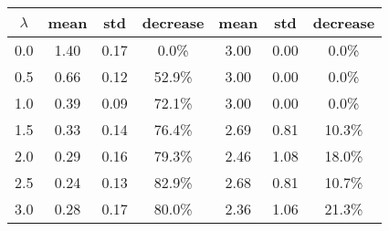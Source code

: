 \begin{tabular}{c||c|c|c||c|c|c}
\toprule
 $\lambda$ &  mean &  std & decrease &  mean &  std & decrease \\
\midrule
       0.0 &  1.40 & 0.17 &    0.0\% &  3.00 & 0.00 &    0.0\% \\
       0.5 &  0.66 & 0.12 &   52.9\% &  3.00 & 0.00 &    0.0\% \\
       1.0 &  0.39 & 0.09 &   72.1\% &  3.00 & 0.00 &    0.0\% \\
       1.5 &  0.33 & 0.14 &   76.4\% &  2.69 & 0.81 &   10.3\% \\
       2.0 &  0.29 & 0.16 &   79.3\% &  2.46 & 1.08 &   18.0\% \\
       2.5 &  0.24 & 0.13 &   82.9\% &  2.68 & 0.81 &   10.7\% \\
       3.0 &  0.28 & 0.17 &   80.0\% &  2.36 & 1.06 &   21.3\% \\
\bottomrule
\end{tabular}
